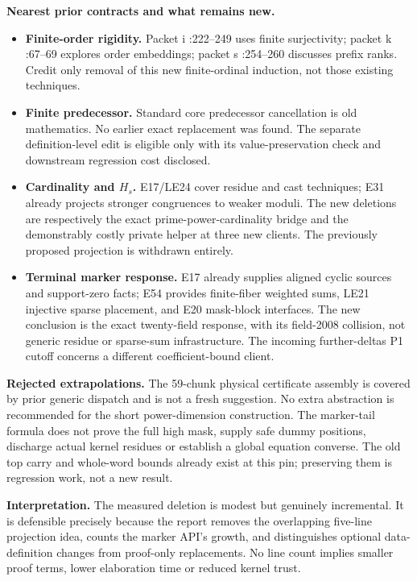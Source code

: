 \textbf{Nearest prior contracts and what remains new.}
\begin{itemize}
\item \textbf{Finite-order rigidity.} Packet i :222--249 uses finite surjectivity; packet k :67--69 explores order embeddings; packet s :254--260 discusses prefix ranks. Credit only removal of this new finite-ordinal induction, not those existing techniques.
\item \textbf{Finite predecessor.} Standard core predecessor cancellation is old mathematics. No earlier exact  replacement was found. The separate definition-level edit is eligible only with its value-preservation check and downstream regression cost disclosed.
\item \textbf{Cardinality and $H_s$.} E17/LE24 cover residue and cast techniques; E31 already projects stronger congruences to weaker moduli. The new deletions are respectively the exact prime-power-cardinality bridge and the demonstrably costly private helper at three new clients. The previously proposed  projection is withdrawn entirely.
\item \textbf{Terminal marker response.} E17 already supplies aligned cyclic sources and support-zero facts; E54 provides finite-fiber weighted sums, LE21 injective sparse placement, and E20 mask-block interfaces. The new conclusion is the exact twenty-field response, with its field-2008 collision, not generic residue or sparse-sum infrastructure. The incoming further-deltas P1 cutoff concerns a different coefficient-bound client.
\end{itemize}

\textbf{Rejected extrapolations.} The 59-chunk physical certificate assembly is covered by prior generic dispatch and is not a fresh suggestion. No extra abstraction is recommended for the short power-dimension construction. The marker-tail formula does not prove the full high mask, supply safe dummy positions, discharge actual kernel residues or establish a global equation converse. The old top carry and whole-word bounds already exist at this pin; preserving them is regression work, not a new result.

\textbf{Interpretation.} The measured deletion is modest but genuinely incremental. It is defensible precisely because the report removes the overlapping five-line projection idea, counts the marker API's growth, and distinguishes optional data-definition changes from proof-only replacements. No line count implies smaller proof terms, lower elaboration time or reduced kernel trust.
